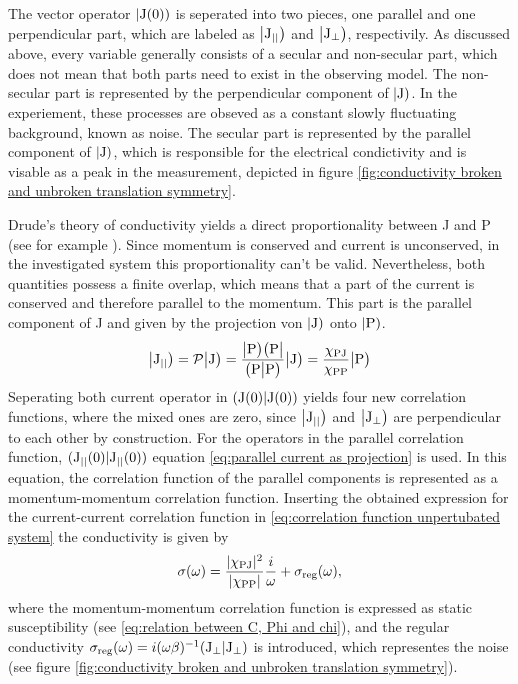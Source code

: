 The vector operator $|\mathrm{\mathrm{J}(0)})$ is seperated into two pieces, one parallel and one perpendicular part, which are labeled as $\big|{\mathrm{J}_{\mid\mid}}\big)$ and $\big|{\mathrm{J}_{\bot}}\big)$, respectivily.
As discussed above, every variable generally consists of a secular and non-secular part, which does not mean that both parts need to exist in the observing model.
The non-secular part is represented by the perpendicular component of $|\mathrm{J})$.
In the experiement, these processes are obseved as a constant slowly fluctuating background, known as noise.
The secular part is represented by the parallel component of $|\mathrm{J})$, which is responsible for the electrical condictivity and is visable as a peak in the measurement, depicted in figure \ref{fig:conductivity broken and unbroken translation symmetry}.

Drude's theory of conductivity yields a direct proportionality between J and P (see for example \cite{Gross&Marx}).
Since momentum is conserved and current is unconserved, in the investigated system this proportionality can't be valid.
Nevertheless, both quantities possess a finite overlap, which means that a part of the current is conserved and therefore parallel to the momentum.
This part is the parallel component of J and given by the projection von $|\mathrm{\mathrm{J}})$ onto $|\mathrm{\mathrm{P}})$.
%
\begin{align}
	\big|{\mathrm{J}_{\mid\mid}}\big) = \mathcal{P}\big|{\mathrm{J}}\big) = \frac{\big|{\mathrm{P}}\big)\big({\mathrm{P}}\big|}{\big({\mathrm{P}}\big|{\mathrm{P}}\big)} \big|{\mathrm{J}}\big) = \frac{\chi_{\mathrm{PJ}}}{\chi_{\mathrm{PP}}} \big|{\mathrm{P}}\big)
	\label{eq:parallel current as projection}
\end{align}
%
Seperating both current operator in $({\mathrm{J}(0)}|{\mathrm{J}(0)})$ yields four new correlation functions, where the mixed ones are zero, since $\big|{\mathrm{J}_{\mid\mid}}\big)$ and $\big|{\mathrm{J}_{\bot}}\big)$ are perpendicular to each other by construction.
For the operators in the parallel correlation function, $({\mathrm{J}_{\mid\mid}(0)}|{\mathrm{J}_{\mid\mid}(0)})$ equation \eqref{eq:parallel current as projection} is used.
In this equation, the correlation function of the parallel components is represented as a momentum-momentum correlation function.
Inserting the obtained expression for the current-current correlation function in \eqref{eq:correlation function unpertubated system} the conductivity is given by 
%
\begin{align}
	\sigma (\omega) = \frac{\vert\chi_{\mathrm{PJ}}\vert^{2}}{\vert\chi_{\mathrm{PP}}\vert} \frac{i}{\omega}  + \sigma_{\mathrm{reg}}(\omega),
\end{align}
%
where the momentum-momentum correlation function is expressed as static susceptibility (see \eqref{eq:relation between C, Phi and chi}), and the regular conductivity $\sigma_{\mathrm{reg}}(\omega) = i(\omega \beta)^{-1} ({\mathrm{J}_{\bot}}|{\mathrm{J}_{\bot}})$ is introduced, which representes the noise (see figure \ref{fig:conductivity broken and unbroken translation symmetry}).

